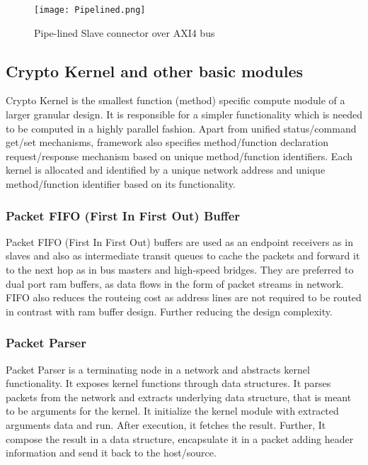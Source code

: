 \documentclass[10pt, conference, compsocconf]{IEEEtran}
\begin{document}
\begin{figure}[!htbp]
  \begin{center}
    \texttt{[image: Pipelined.png]}
    \caption{Pipe-lined Slave connector over AXI4 bus}
    \label{fig:Pipelined}
  \end{center}
\end{figure}


\subsection{Crypto Kernel and other basic modules}
Crypto Kernel is the smallest function (method) specific compute module of a larger granular design. It is responsible for a simpler functionality which is needed to be computed in a highly parallel fashion. Apart from unified status/command get/set mechanisms, framework also specifies method/function declaration request/response mechanism based on unique method/function identifiers. Each kernel is allocated and identified by a unique network address and unique method/function identifier based on its functionality.

\subsubsection{Packet FIFO (First In First Out) Buffer}
Packet FIFO (First In First Out) buffers are used as an endpoint receivers as in slaves and also as intermediate transit queues to cache the packets and forward it to the next hop as in bus masters and high-speed bridges. They are preferred to dual port ram buffers, as data flows in the form of packet streams in network. FIFO also reduces the routeing cost as address lines are not required to be routed in contrast with ram buffer design. Further reducing the design complexity.  

\subsubsection{Packet Parser}
Packet Parser is a terminating node in a network and abstracts kernel functionality. It exposes kernel functions through data structures. It parses packets from the network and extracts underlying data structure, that is meant to be arguments for the kernel. It initialize the kernel module with extracted arguments data and run. After execution, it fetches the result. Further, It compose the result in a data structure, encapsulate it in a packet adding header information and send it back to the host/source. 
\end{document}
